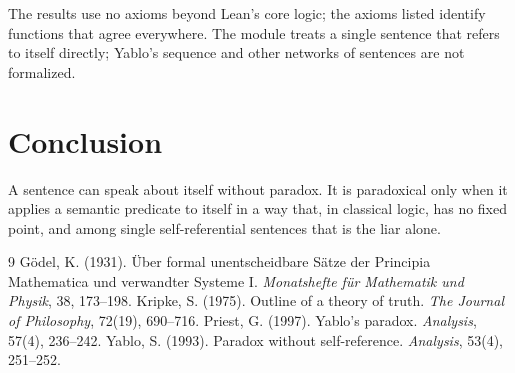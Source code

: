 \documentclass{situationist-preprint}
\begin{document}
The results use no axioms beyond Lean's core logic; the axioms listed identify functions that agree everywhere. The module treats a single sentence that refers to itself directly; Yablo's sequence and other networks of sentences are not formalized.

\section{Conclusion}

A sentence can speak about itself without paradox. It is paradoxical only when it applies a semantic predicate to itself in a way that, in classical logic, has no fixed point, and among single self-referential sentences that is the liar alone.

\begin{thebibliography}{9}\small
{} G\"odel, K. (1931). \"Uber formal unentscheidbare S\"atze der Principia Mathematica und verwandter Systeme I. \emph{Monatshefte f\"ur Mathematik und Physik}, 38, 173--198.
 Kripke, S. (1975). Outline of a theory of truth. \emph{The Journal of Philosophy}, 72(19), 690--716.
 Priest, G. (1997). Yablo's paradox. \emph{Analysis}, 57(4), 236--242.
 Yablo, S. (1993). Paradox without self-reference. \emph{Analysis}, 53(4), 251--252.
\end{thebibliography}
\end{document}
